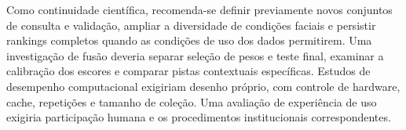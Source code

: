 Como continuidade científica, recomenda-se definir previamente novos conjuntos de consulta e validação, ampliar a diversidade de condições faciais e persistir rankings completos quando as condições de uso dos dados permitirem. Uma investigação de fusão deveria separar seleção de pesos e teste final, examinar a calibração dos escores e comparar pistas contextuais específicas. Estudos de desempenho computacional exigiriam desenho próprio, com controle de hardware, cache, repetições e tamanho de coleção. Uma avaliação de experiência de uso exigiria participação humana e os procedimentos institucionais correspondentes.

